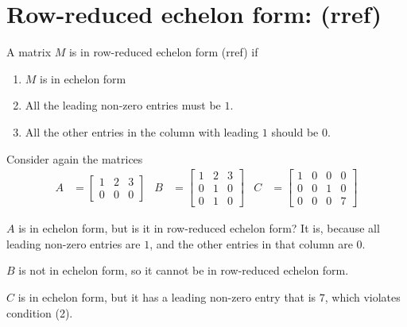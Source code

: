 \documentclass[11pt]{article}
\begin{document}
\section*{Row-reduced echelon form: (rref)}

\begin{minipage}[t]{.95\textwidth}
	A matrix $M$ is in row-reduced echelon form (rref) if
	\begin{enumerate}
	\item{$M$ is in echelon form}
	\item{All the leading non-zero entries must be $1$.}
	\item{All the other entries in the column with leading $1$ should be $0$.}
	\end{enumerate}
\end{minipage}

Consider again the matrices
\begin{align*}
A &= \begin{bmatrix}
1 & 2 & 3
\\
0 & 0 & 0
\end{bmatrix}
&
B &= \begin{bmatrix}
1 & 2 & 3
\\
0 & 1 & 0
\\
0 & 1 & 0
\end{bmatrix}
&
C &= \begin{bmatrix}
1 & 0 & 0 & 0
\\
0 & 0 & 1 & 0
\\
0 & 0 & 0 & 7
\end{bmatrix}
\end{align*}

$A$ is in echelon form, but is it in row-reduced echelon form? It is, because all leading non-zero entries are $1$, and the other entries in that column are $0$.

$B$ is not in echelon form, so it cannot be in row-reduced echelon form.

$C$ is in echelon form, but it has a leading non-zero entry that is $7$, which violates condition (2).
\end{document}
